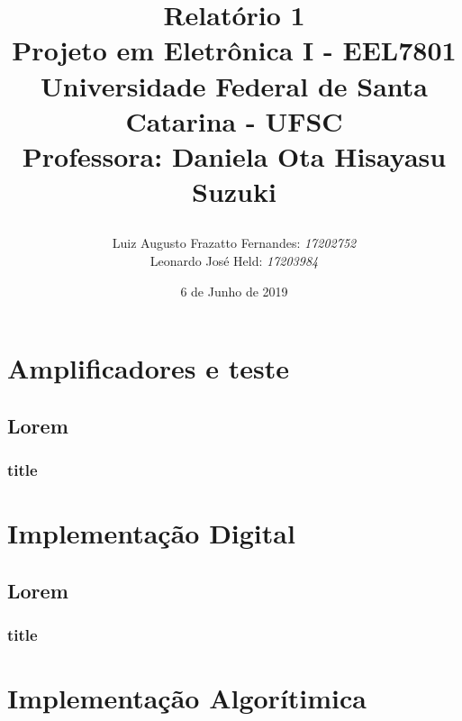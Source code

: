 \documentclass[11pt,a4paper]{report}
\title{Relatório 1  \\
	Projeto em Eletrônica I - EEL7801 \\ \vfill
	\normalsize{Universidade Federal de Santa Catarina - UFSC \\
		Professora: Daniela Ota Hisayasu Suzuki}
	\author{
		{Luiz Augusto Frazatto Fernandes: \it{17202752}} \\
		{Leonardo José Held: \it{17203984}}
	}
}
\date{6 de Junho de 2019}
\begin{document}
	\maketitle
	\setcounter{chapter}{0}
	\chapter{Amplificadores e teste}
	\section{Lorem}
	\subsection{title}
		
	\chapter{Implementação Digital}
	
	\section{Lorem}
	\subsection{title}
	
	\chapter{Implementação Algorítimica}
	
\end{document}
